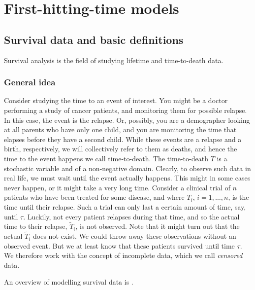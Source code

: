 \chapter{First-hitting-time models}

\section{Survival data and basic definitions}
Survival analysis is the field of studying lifetime and time-to-death data. 

\subsection{General idea}
Consider studying the time to an event of interest. You might be a doctor performing a study of cancer patients, and monitoring them
for possible relapse. In this case, the event is the relapse. Or, possibly, you are a demographer looking at all parents who have only one child, and you are monitoring the time that elapses before they have a second child.
While these events are a relapse and a birth, respectively, we will
collectively refer to them as deaths, and hence the time to the event happens we call time-to-death.
The time-to-death $T$ is a stochastic variable and of a non-negative domain.
Clearly, to observe such data in real life, we must wait until the event actually happens. This might in some cases never happen, or it might take a very long time. Consider a clinical trial of $n$ patients who have been treated for some disease, and where $T_i$, $i=1,\ldots,n$, is the time until their relapse. Such a trial can only last a certain amount of time, say, until $\tau$.
Luckily, not every patient relapses during that time, and so the actual time to their relapse, $\tilde{T}_i$, is not observed. Note that it might turn out that the actual $\tilde{T}_i$ does not exist.
We could throw away these observations without an observed event. But we at least know that these patients survived until time $\tau$. We therefore work with the concept of incomplete data, which we call \textit{censored} data.

An overview of modelling survival data is \citet{ABG}.

